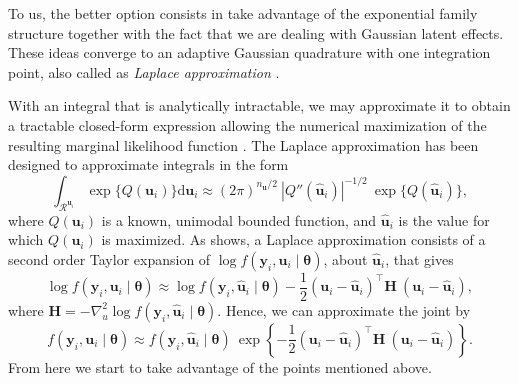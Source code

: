 To us, the better option consists in take advantage of the exponential
family structure together with the fact that we are dealing with
Gaussian latent effects. These ideas converge to an adaptive Gaussian
quadrature with one integration point, also called as \textit{Laplace
approximation}
\cite{molenberghs&verbeke, LA4H, tierney, corestats}.

With an integral that is analytically intractable, we may approximate it
to obtain a tractable closed-form expression allowing the numerical
maximization of the resulting marginal likelihood function
\cite{patrao}. The Laplace approximation has been designed to
approximate integrals in the form
\begin{equation}
 \int_{\mathcal{R}^{\bm{u}_{i}}}
 \exp\{Q(\bm{u}_{i})\} \text{d} \bm{u}_{i}\approx
 (2\pi)^{n_{\bm{u}}/2}~
 |{Q}''(\bm{\hat{u}}_{i})|^{-1/2}~\exp\{Q(\bm{\hat{u}}_{i})\},
 \label{eq:laplace}
\end{equation}
where \(Q(\bm{u}_{i})\) is a known, unimodal bounded function, and
\(\bm{\hat{u}}_{i}\) is the value for which \(Q(\bm{u}_{i})\) is
maximized. As  shows, a Laplace approximation
consists of a second order Taylor expansion of \(\log f(\bm{y}_{i},
\bm{u}_{i} \mid \bm{\theta})\), about \(\bm{\hat{u}}_{i}\), that gives
\[
 \log f(\bm{y}_{i}, \bm{u}_{i} \mid \bm{\theta})\approx
 \log f(\bm{y}_{i}, \bm{\hat{u}}_{i} \mid \bm{\theta}) -
 \frac{1}{2} (\bm{u}_{i} - \bm{\hat{u}}_{i})^{\top}\bm{H}~
             (\bm{u}_{i} - \bm{\hat{u}}_{i}),
\]
where \(\bm{H} = - \nabla_{u}^{2} \log f(\bm{y}_{i}, \bm{\hat{u}}_{i}
\mid \bm{\theta})\). Hence, we can approximate the joint by
\begin{equation}
 f(\bm{y}_{i}, \bm{u}_{i} \mid \bm{\theta})\approx
 f(\bm{y}_{i}, \bm{\hat{u}}_{i} \mid \bm{\theta})~\exp
 \left\{-\frac{1}{2} (\bm{u}_{i} - \bm{\hat{u}}_{i})^{\top}\bm{H}~
                     (\bm{u}_{i} - \bm{\hat{u}}_{i})
 \right\}.
 \label{eq:taylor}
\end{equation}
From here we start to take advantage of the points mentioned above.

